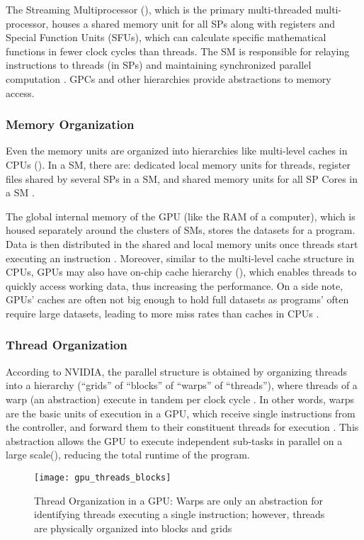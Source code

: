 The Streaming Multiprocessor (), which is the primary multi-threaded multi-processor, houses a shared memory unit for all SPs along with registers and Special Function Units (SFUs), which can calculate specific mathematical functions in fewer clock cycles than threads. The SM is responsible for relaying instructions to threads (in SPs) and maintaining synchronized parallel computation \cite{PascalWhitepaper, DemystifyingGPU}. GPCs and other hierarchies provide abstractions to memory access.

\subsubsection{Memory Organization}
Even the memory units are organized into hierarchies like multi-level caches in CPUs (). In a SM, there are: dedicated local memory units for threads, register files shared by several SPs in a SM, and shared memory units for all SP Cores in a SM \cite{PascalWhitepaper, ParallelNVIDIA}.

The global internal memory of the GPU (like the RAM of a computer), which is housed separately around the clusters of SMs, stores the datasets for a program. Data is then distributed in the shared and local memory units once threads start executing an instruction \cite[Appendix~B]{PattersonARM}. Moreover, similar to the multi-level cache structure in CPUs, GPUs may also have on-chip cache hierarchy (), which enables threads to quickly access working data, thus increasing the performance. On a side note, GPUs' caches are often not big enough to hold full datasets as programs' often require large datasets, leading to more miss rates than caches in CPUs \cite[Appendix~B]{PattersonARM}. 

\subsubsection{Thread Organization}
According to NVIDIA, the parallel structure is obtained by organizing threads into a hierarchy (``grids'' of ``blocks'' of ``warps'' of ``threads''), where threads of a warp (an abstraction) execute in tandem per clock cycle \cite{CUDADocs, DemystifyingGPU}\cite[Appendix~B]{PattersonARM}. In other words, warps are the basic units of execution in a GPU, which receive single instructions from the controller, and forward them to their constituent threads for execution \cite{CUDADocs, DemystifyingGPU}. This abstraction allows the GPU to execute independent sub-tasks in parallel on a large scale(), reducing the total runtime of the program.
\begin{figure}[!htbp]
    \centering
    \texttt{[image: gpu\_threads\_blocks]}
    \caption[Thread Organization in a GPU]{Thread Organization in a GPU: Warps are only an abstraction for identifying threads executing a single instruction; however, threads are physically organized into blocks and grids \cite{CUDADocs,ParallelNVIDIA}}
    \label{fig:GPU - Thread Organization in a GPU}
\end{figure}

